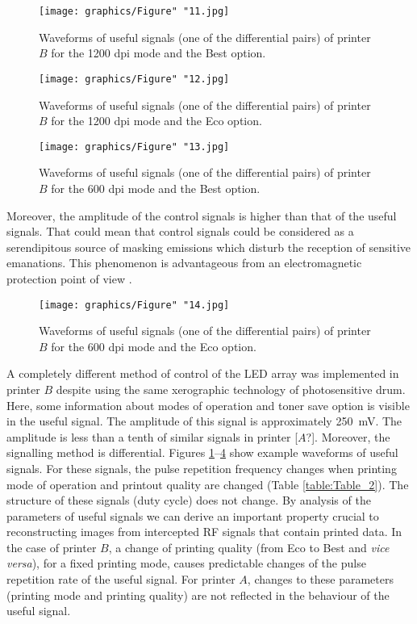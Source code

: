 \documentclass[10pt,a4paper]{article}
\begin{document}
\begin{figure}[ht]
    \centering
    \texttt{[image: graphics/Figure" "11.jpg]}
    \caption{Waveforms of useful signals (one of the differential pairs) of
        printer $B$ for the 1200 dpi mode and the Best option.}
    \label{figure:Figure_11}
\end{figure}

\begin{figure}[ht]
    \centering
    \texttt{[image: graphics/Figure" "12.jpg]}
    \caption{Waveforms of useful signals (one of the differential pairs) of
        printer $B$ for the 1200 dpi mode and the Eco option.}
    \label{figure:Figure_12}
\end{figure}

\begin{figure}[ht]
    \centering
    \texttt{[image: graphics/Figure" "13.jpg]}
    \caption{Waveforms of useful signals (one of the differential pairs) of
        printer $B$ for the 600 dpi mode and the Best option.}
    \label{figure:Figure_13}
\end{figure}

Moreover, the amplitude of the control signals is higher than that of the
useful signals. That could mean that control signals could be considered as a
serendipitous source of masking emissions which disturb the reception of
sensitive emanations. This phenomenon is advantageous from an electromagnetic
protection point of view \cite{Ulas2016a,Guerrieri2018a,Loughry2002a}.

\begin{figure}[ht]
    \centering
    \texttt{[image: graphics/Figure" "14.jpg]}
    \caption{Waveforms of useful signals (one of the differential pairs) of
        printer $B$ for the 600 dpi mode and the Eco option.}
    \label{figure:Figure_14}
\end{figure}

A completely different method of control of the LED array was implemented in
printer $B$ despite using the same xerographic technology of photosensitive
drum. Here, some information about modes of operation and toner save option is
visible in the useful signal. The amplitude of this signal is approximately
\SI{250}{\milli\volt}. The amplitude is less than a tenth of similar signals
in printer [$A$?]. Moreover, the signalling method is differential.
Figures \ref{figure:Figure_11}--\ref{figure:Figure_14} show example waveforms
of useful signals. For these signals, the pulse repetition frequency changes
when printing mode of operation and printout quality are changed (Table
\ref{table:Table_2}). The structure of these signals (duty cycle) does not
change. By analysis of the parameters of useful signals we can derive an
important property crucial to reconstructing images from intercepted RF
signals that contain printed data. In the case of printer $B$, a change of
printing quality (from Eco to Best and {\it vice versa}), for a fixed
printing mode, causes predictable changes of the pulse repetition rate of the
useful signal. For printer $A$, changes to these parameters (printing mode
and printing quality) are not reflected in the behaviour of the useful
signal.
\end{document}

